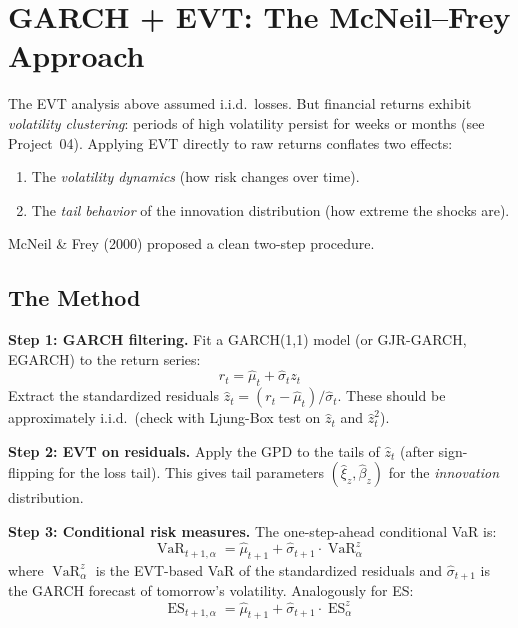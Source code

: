 \documentclass[11pt, a4paper]{article}
\theoremstyle{definition}
\theoremstyle{plain}
\theoremstyle{remark}
\newcommand{\VaR}{\operatorname{VaR}}
\newcommand{\ES}{\operatorname{ES}}
\begin{document}
\section{GARCH + EVT: The McNeil--Frey Approach}
\label{sec:garch-evt}

The EVT analysis above assumed i.i.d.\ losses.
But financial returns exhibit \emph{volatility clustering}:
periods of high volatility persist for weeks or months (see Project~04).
Applying EVT directly to raw returns conflates two effects:
\begin{enumerate}
    \item The \emph{volatility dynamics} (how risk changes over time).
    \item The \emph{tail behavior} of the innovation distribution (how extreme the shocks are).
\end{enumerate}

McNeil \& Frey (2000) proposed a clean two-step procedure.

\subsection{The Method}

\begin{keyidea}
\textbf{Step 1: GARCH filtering.}
Fit a GARCH(1,1) model (or GJR-GARCH, EGARCH) to the return series:
\[
    r_t = \hat\mu_t + \hat\sigma_t z_t
\]
Extract the standardized residuals $\hat{z}_t = (r_t - \hat\mu_t) / \hat\sigma_t$.
These should be approximately i.i.d.\ (check with Ljung-Box test on $\hat{z}_t$ and $\hat{z}_t^2$).

\medskip
\textbf{Step 2: EVT on residuals.}
Apply the GPD to the tails of $\hat{z}_t$ (after sign-flipping for the loss tail).
This gives tail parameters $(\hat\xi_z, \hat\beta_z)$ for the \emph{innovation} distribution.

\medskip
\textbf{Step 3: Conditional risk measures.}
The one-step-ahead conditional VaR is:
\[
    \VaR_{t+1, \alpha} = \hat\mu_{t+1} + \hat\sigma_{t+1} \cdot \VaR_\alpha^{z}
\]
where $\VaR_\alpha^{z}$ is the EVT-based VaR of the standardized residuals and
$\hat\sigma_{t+1}$ is the GARCH forecast of tomorrow's volatility.
Analogously for ES:
\[
    \ES_{t+1, \alpha} = \hat\mu_{t+1} + \hat\sigma_{t+1} \cdot \ES_\alpha^{z}
\]
\end{keyidea}
\end{document}
